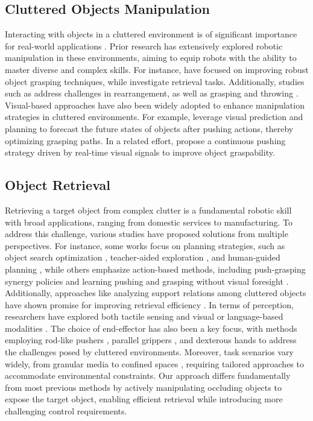 \documentclass[10pt, a4paper, logo, twocolumn, copyright]{psibot} %
\begin{document}
\subsection{Cluttered Objects Manipulation}
Interacting with objects in a cluttered environment is of significant importance for real-world applications \cite{6907059, 1087038, 9197318}. Prior research has extensively explored robotic manipulation in these environments, aiming to equip robots with the ability to master diverse and complex skills. For instance, \citet{9197318, 10342335} have focused on improving robust object grasping techniques, while \citet{li2024broadcasting, 10611541} investigate retrieval tasks. Additionally, studies such as \citet{goyal2022ifor, pmlr-v205-tang23a, jia2024cluttergen} address challenges in rearrangement, as well as grasping and throwing \cite{kasaei2024harnessing}. Visual-based approaches have also been widely adopted to enhance manipulation strategies in cluttered environments. For example, \citet{9591286} leverage visual prediction and planning to forecast the future states of objects after pushing actions, thereby optimizing grasping paths. In a related effort, \citet{9341545} propose a continuous pushing strategy driven by real-time visual signals to improve object graspability.

\subsection{Object Retrieval}
Retrieving a target object from complex clutter is a fundamental robotic skill with broad applications, ranging from domestic services to manufacturing. To address this challenge, various studies have proposed solutions from multiple perspectives. For instance, some works focus on planning strategies, such as object search optimization \cite{8793494}, teacher-aided exploration \cite{9341545}, and human-guided planning \cite{9196689}, while others emphasize action-based methods, including push-grasping synergy policies \cite{9465702} and learning pushing and grasping without visual foresight \cite{8794143}. Additionally, approaches like analyzing support relations among cluttered objects have shown promise for improving retrieval efficiency \cite{li2024broadcasting}. In terms of perception, researchers have explored both tactile sensing \cite{xu2024tactile, 10611541} and visual or language-based modalities \cite{lemke2024spotcompose, pmlr-v205-tang23a}. The choice of end-effector has also been a key focus, with methods employing rod-like pushers \cite{10161041}, parallel grippers \cite{9636230, pmlr-v205-tang23a, 10611541, 9812132}, and dexterous hands \cite{pmlr-v229-chen23e} to address the challenges posed by cluttered environments. Moreover, task scenarios vary widely, from granular media \cite{xu2024tactile} to confined spaces \cite{10611541}, requiring tailored approaches to accommodate environmental constraints. Our approach differs fundamentally from most previous methods by actively manipulating occluding objects to expose the target object, enabling efficient retrieval while introducing more challenging control requirements.
\end{document}
